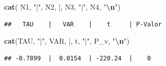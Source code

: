 \documentclass[
]{article}
\newenvironment{Shaded}{\begin{snugshade}}{\end{snugshade}}
\newcommand{\FunctionTok}[1]{\textcolor[rgb]{0.13,0.29,0.53}{\textbf{#1}}}
\newcommand{\NormalTok}[1]{#1}
\newcommand{\SpecialCharTok}[1]{\textcolor[rgb]{0.81,0.36,0.00}{\textbf{#1}}}
\newcommand{\StringTok}[1]{\textcolor[rgb]{0.31,0.60,0.02}{#1}}
\begin{document}
\begin{Shaded}
\begin{Highlighting}[]
\FunctionTok{cat}\NormalTok{( N1, }\StringTok{"|"}\NormalTok{, N2, }\StringTok{\textquotesingle{}|\textquotesingle{}}\NormalTok{, N3, }\StringTok{"|"}\NormalTok{, N4,  }\StringTok{"}\SpecialCharTok{\textbackslash{}n}\StringTok{"}\NormalTok{)}
\end{Highlighting}
\end{Shaded}

\begin{verbatim}
##   TAU    |   VAR    |    t     | P-Valor
\end{verbatim}

\begin{Shaded}
\begin{Highlighting}[]
\FunctionTok{cat}\NormalTok{(TAU, }\StringTok{"|"}\NormalTok{, VAR, }\StringTok{\textquotesingle{}|\textquotesingle{}}\NormalTok{, t, }\StringTok{"|"}\NormalTok{, P\_v,  }\StringTok{"}\SpecialCharTok{\textbackslash{}n}\StringTok{"}\NormalTok{)}
\end{Highlighting}
\end{Shaded}

\begin{verbatim}
## -0.7899  |  0.0154  | -220.24  |    0
\end{verbatim}
\end{document}
